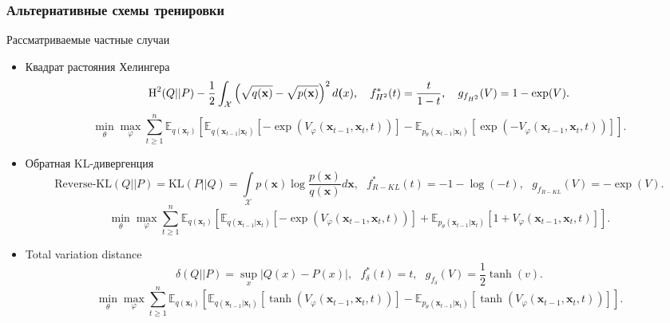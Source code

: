 \documentclass[8pt]{beamer}
\begin{document}
\begin{frame}
	\frametitle{Альтернативные схемы тренировки}
	\begin{block}{Рассматриваемые частные случаи}
		\begin{itemize}
			\item Квадрат растояния Хелингера
				\begin{equation*}
					\text{H}^2(Q||P) - \frac{1}{2}\int_\mathcal{X} \left(\sqrt{q(\textbf{x})} - \sqrt{p(\textbf{x})}\right)^2d\textbf(x), ~~~f^*_{H^2}(t) = \frac{t}{1 - t}, ~~~ g_{f_{H^2}}(V) = 1 - \exp(V).
				\end{equation*}
				 \begin{equation*}
					\min\limits_\theta\max\limits_\varphi\sum\limits_{t\geqslant 1}^n \mathbb{E}_{q(\textbf{x}_t)}\left[\mathbb{E}_{q(\textbf{x}_{t-1}|\textbf{x}_t)}[- \exp{(V_\varphi(\textbf{x}_{t-1}, \textbf{x}_t, t))}] - \mathbb{E}_{p_\theta(\textbf{x}_{t-1}|\textbf{x}_t)}[\exp{(-V_\varphi(\textbf{x}_{t-1}, \textbf{x}_t, t))}]\right].
				\end{equation*}
			\item Обратная KL-дивергенция
				\begin{equation*}
					\text{Reverse-KL}(Q||P) = \text{KL}(P||Q) = \int\limits_\mathcal{X} p(\textbf{x})\log{\frac{p(\textbf{x})}{q(\textbf{x})}}d\textbf{x}, ~~~ f^*_{R-KL}(t) = -1- \log({-t}),~~~ g_{f_{R-KL}}(V) = - \exp(V).
				\end{equation*}
				\begin{equation*}
					\min\limits_\theta\max\limits_\varphi\sum\limits_{t\geqslant 1}^n \mathbb{E}_{q(\textbf{x}_t)}\left[\mathbb{E}_{q(\textbf{x}_{t-1}|\textbf{x}_t)}[- \exp{(V_\varphi(\textbf{x}_{t-1}, \textbf{x}_t, t))}] + \mathbb{E}_{p_\theta(\textbf{x}_{t-1}|\textbf{x}_t)}[1+V_\varphi(\textbf{x}_{t-1}, \textbf{x}_t, t)]\right].
				\end{equation*}
			\item Total variation distance
				\begin{equation*}
					\delta (Q||P) = \sup\limits_x|Q(x) - P(x)|,~~~f^*_{\delta}(t) = t, ~~~ g_{f_{\delta}}(V) = \frac{1}{2}\tanh{(v)}.
				\end{equation*}
				\begin{equation*}
					\min\limits_\theta\max\limits_\varphi\sum\limits_{t\geqslant 1}^n \mathbb{E}_{q(\textbf{x}_t)}\left[\mathbb{E}_{q(\textbf{x}_{t-1}|\textbf{x}_t)}\left[\tanh{(V_\varphi(\textbf{x}_{t-1}, \textbf{x}_t, t))}\right] - \mathbb{E}_{p_\theta(\textbf{x}_{t-1}|\textbf{x}_t)}\left[\tanh{(V_\varphi(\textbf{x}_{t-1}, \textbf{x}_t, t))}\right]\right].
				\end{equation*}	
		\end{itemize}
	\end{block}	
\end{frame}
\end{document}
